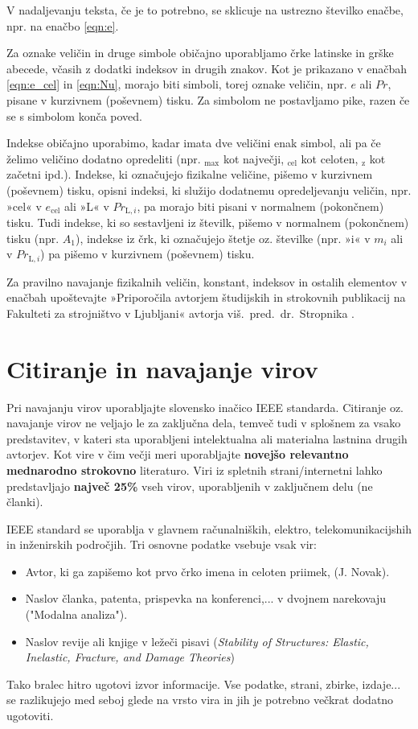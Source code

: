 V nadaljevanju teksta, če je to potrebno, se sklicuje na ustrezno številko enačbe, npr. na enačbo \eqref{eqn:e}.

Za oznake veličin in druge simbole običajno uporabljamo črke latinske in grške abecede, včasih z dodatki indeksov in drugih znakov. Kot je prikazano v enačbah \eqref{eqn:e_cel} in \eqref{eqn:Nu}, morajo biti simboli, torej oznake veličin, npr. $e$ ali $Pr$, pisane v kurzivnem (poševnem) tisku. Za simbolom ne postavljamo pike, razen če se s simbolom konča poved.

Indekse običajno uporabimo, kadar imata dve veličini enak simbol, ali pa če želimo veličino dodatno opredeliti (npr. $_{\text{max}}$ kot največji, $_{\text{cel}}$ kot celoten, $_{\text{z}}$ kot začetni ipd.). Indekse, ki označujejo fizikalne veličine, pišemo v kurzivnem (poševnem) tisku, opisni indeksi, ki služijo dodatnemu opredeljevanju veličin, npr. »cel« v $e_{\text{cel}}$ ali »L« v $Pr_{\text{L},i}$, pa morajo biti pisani v normalnem (pokončnem) tisku. Tudi indekse, ki so sestavljeni iz številk, pišemo v normalnem (pokončnem) tisku (npr. $A_1$), indekse iz črk, ki označujejo štetje oz. številke (npr. »i« v $m_i$ ali v $Pr_{\text{L},i}$) pa pišemo v kurzivnem (poševnem) tisku.

Za pravilno navajanje fizikalnih veličin, konstant, indeksov in ostalih elementov v enačbah upoštevajte »Priporočila avtorjem študijskih in strokovnih publikacij na Fakulteti za strojništvo v Ljubljani« avtorja viš.~pred.~dr.~Stropnika \cite{stropnik_1997}.

\section{Citiranje in navajanje virov}\label{sec:citiranje}

Pri navajanju virov uporabljajte slovensko inačico IEEE standarda. Citiranje 
oz. navajanje virov ne veljajo le za zaključna dela, temveč tudi v splošnem za 
vsako predstavitev, v kateri sta uporabljeni intelektualna ali materialna 
lastnina drugih avtorjev. Kot vire v čim večji meri uporabljajte 
\textbf{novejšo relevantno mednarodno strokovno} literaturo. Viri iz spletnih 
strani/internetni lahko predstavljajo \textbf{največ 25\%} vseh virov, 
uporabljenih v zaključnem delu (ne članki).

IEEE standard se uporablja v glavnem računalniških, elektro, 
telekomunikacijshih in inženirskih področjih. Tri osnovne podatke vsebuje vsak 
vir:
\begin{itemize}
	\item Avtor, ki ga zapišemo kot prvo črko imena in celoten priimek, (J. 
	Novak).
	\item Naslov članka, patenta, prispevka na konferenci,...  v dvojnem 
	narekovaju ("Modalna analiza").
	\item Naslov revije ali knjige v ležeči pisavi (\emph{Stability of 
		Structures: Elastic, Inelastic, Fracture, and Damage Theories})
\end{itemize}
Tako bralec hitro ugotovi izvor informacije. Vse podatke, strani, zbirke, 
izdaje...  se razlikujejo med seboj glede na vrsto vira in jih je potrebno 
večkrat dodatno ugotoviti. 

